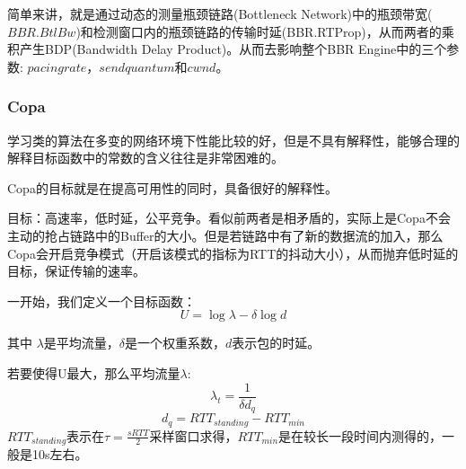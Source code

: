 \documentclass[a4paper, 12pt, UTF8]{ctexart}
\begin{document}
\par 简单来讲，就是通过动态的测量瓶颈链路(Bottleneck Network)中的瓶颈带宽($BBR.BtlBw$)和检测窗口内的瓶颈链路的传输时延(BBR.RTProp)，从而两者的乘积产生BDP(Bandwidth Delay Product)。从而去影响整个BBR Engine中的三个参数: $pacing rate$，$send quantum$和$cwnd$。



\subsubsection{Copa}

\par 学习类的算法在多变的网络环境下性能比较的好，但是不具有解释性\cite{DongMZAGGS18}，能够合理的解释目标函数中的常数的含义往往是非常困难的。


\par Copa\cite{DBLP:conf/nsdi/ArunB18}的目标就是在提高可用性的同时，具备很好的解释性。

\par 目标：高速率，低时延，公平竞争。看似前两者是相矛盾的，实际上是Copa不会主动的抢占链路中的Buffer的大小。但是若链路中有了新的数据流的加入，那么Copa会开启竞争模式（开启该模式的指标为RTT的抖动大小），从而抛弃低时延的目标，保证传输的速率。

\par 一开始，我们定义一个目标函数：
$$
U = \log\lambda-\delta \log d
$$
\par 其中 $\lambda$是平均流量，$\delta$是一个权重系数，$d$表示包的时延。

\par 若要使得U最大，那么平均流量$\lambda$:
$$
\lambda_t = \frac{1}{\delta d_q}
$$
$$
d_q = RTT_{standing}-RTT_{min}
$$
$RTT_{standing}$表示在$ \tau = \frac{sRTT}{2}$采样窗口求得，$RTT_{min}$是在较长一段时间内测得的，一般是10s左右。
\end{document}
